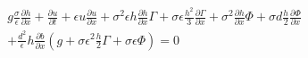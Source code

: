\documentclass[12pt]{article}
\begin{document}
\begin{equation}
\begin{split}
g \frac{\sigma}{\epsilon}\frac{\partial h}{\partial x} +  \frac{\partial u}{\partial t } + \epsilon u \frac{\partial u}{\partial x} + \sigma^2 \epsilon h\frac{\partial h}{\partial x} \Gamma  + \sigma \epsilon \frac{h^2}{3}\frac{\partial \Gamma}{\partial x}+ \sigma^2 \frac{\partial h}{\partial x}\Phi + \sigma d\frac{h}{2}\frac{\partial \Phi}{\partial x}  \\ + \frac{d^2}{\epsilon}h \frac{\partial b}{\partial x}\left(g + \sigma \epsilon^2 \frac{h}{2} \Gamma + \sigma \epsilon\Phi \right) = 0
\end{split}
\end{equation}
\end{document}
